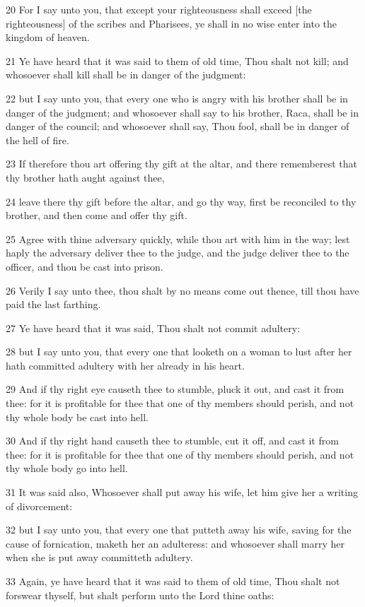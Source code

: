 \par 20 For I say unto you, that except your righteousness shall exceed [the righteousness] of the scribes and Pharisees, ye shall in no wise enter into the kingdom of heaven.
\par 21 Ye have heard that it was said to them of old time, Thou shalt not kill; and whosoever shall kill shall be in danger of the judgment:
\par 22 but I say unto you, that every one who is angry with his brother shall be in danger of the judgment; and whosoever shall say to his brother, Raca, shall be in danger of the council; and whosoever shall say, Thou fool, shall be in danger of the hell of fire.
\par 23 If therefore thou art offering thy gift at the altar, and there rememberest that thy brother hath aught against thee,
\par 24 leave there thy gift before the altar, and go thy way, first be reconciled to thy brother, and then come and offer thy gift.
\par 25 Agree with thine adversary quickly, while thou art with him in the way; lest haply the adversary deliver thee to the judge, and the judge deliver thee to the officer, and thou be cast into prison.
\par 26 Verily I say unto thee, thou shalt by no means come out thence, till thou have paid the last farthing.
\par 27 Ye have heard that it was said, Thou shalt not commit adultery:
\par 28 but I say unto you, that every one that looketh on a woman to lust after her hath committed adultery with her already in his heart.
\par 29 And if thy right eye causeth thee to stumble, pluck it out, and cast it from thee: for it is profitable for thee that one of thy members should perish, and not thy whole body be cast into hell.
\par 30 And if thy right hand causeth thee to stumble, cut it off, and cast it from thee: for it is profitable for thee that one of thy members should perish, and not thy whole body go into hell.
\par 31 It was said also, Whosoever shall put away his wife, let him give her a writing of divorcement:
\par 32 but I say unto you, that every one that putteth away his wife, saving for the cause of fornication, maketh her an adulteress: and whosoever shall marry her when she is put away committeth adultery.
\par 33 Again, ye have heard that it was said to them of old time, Thou shalt not forswear thyself, but shalt perform unto the Lord thine oaths:
